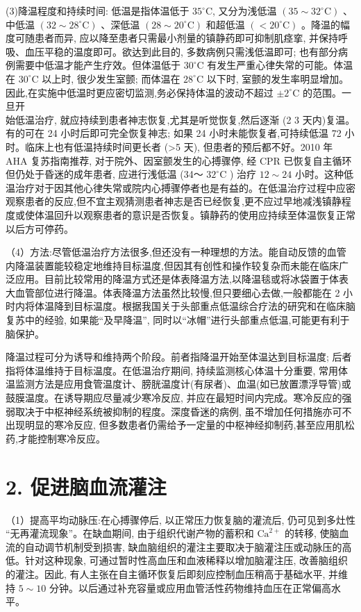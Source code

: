 \documentclass[10pt]{article}
\begin{document}
(3)降温程度和持续时间: 低温是指体温低于 $35^{\circ} \mathrm{C}$, 又分为浅低温 $\left(35 \sim 32^{\circ} \mathrm{C}\right)$ 、中低温 $\left(32 \sim 28^{\circ} \mathrm{C}\right)$ 、深低温 $\left(28 \sim 20^{\circ} \mathrm{C}\right)$ 和超低温 $\left(<20^{\circ} \mathrm{C}\right)$ 。降温的幅度可随患者而异, 应以降至患者只需最小剂量的镇静药即可抑制肌痉挛, 并保持呼吸、血压平稳的温度即可。欲达到此目的, 多数病例只需浅低温即可; 也有部分病例需要中低温才能产生疗效。但体温低于 $30^{\circ} \mathrm{C}$ 有发生严重心律失常的可能。体温在 $30^{\circ} \mathrm{C}$ 以上时, 很少发生室颤; 而体温在 $28^{\circ} \mathrm{C}$ 以下时, 室颤的发生率明显增加。因此,在实施中低温时更应密切监测,务必保持体温的波动不超过 $\pm 2^{\circ} \mathrm{C}$ 的范围。一旦开\\
始低温治疗, 就应持续到患者神志恢复,尤其是听觉恢复,然后逐渐 (2 3 天内)复温。有的可在 24 小时后即可完全恢复神志; 如果 24 小时未能恢复者,可持续低温 72 小时。临床上也有低温持续时间更长者 (>5 天), 但患者的预后都不好。2010 年 AHA 复苏指南推荐, 对于院外、因室颤发生的心搏骤停, 经 CPR 已恢复自主循环但仍处于昏迷的成年患者, 应进行浅低温 (34～ $32^{\circ} \mathrm{C}$ ) 治疗 $12 \sim 24$ 小时。这种低温治疗对于因其他心律失常或院内心搏骤停者也是有益的。在低温治疗过程中应密观察患者的反应,但不宜主观猜测患者神志是否已经恢复,更不应过早地减浅镇静程度或使体温回升以观察患者的意识是否恢复。镇静药的使用应持续至体温恢复正常以后方可停药。

（4）方法:尽管低温治疗方法很多,但还没有一种理想的方法。能自动反馈的血管内降温装置能较稳定地维持目标温度,但因其有创性和操作较复杂而未能在临床广泛应用。目前比较常用的降温方式还是体表降温方法,以降温毯或将冰袋置于体表大血管部位进行降温。体表降温方法虽然比较慢,但只要细心去做,一般都能在 2 小时内将体温降到目标温度。根据我国关于头部重点低温综合疗法的研究和在临床脑复苏中的经验, 如果能“及早降温”, 同时以“冰帽”进行头部重点低温,可能更有利于脑保护。

降温过程可分为诱导和维持两个阶段。前者指降温开始至体温达到目标温度; 后者指将体温维持于目标温度。在低温治疗期间, 持续监测核心体温十分重要, 常用体温监测方法是应用食管温度计、膀胱温度计(有尿者)、血温(如已放置漂浮导管)或鼓膜温度。在诱导期应尽量减少寒冷反应, 并应在最短时间内完成。寒冷反应的强弱取决于中枢神经系统被抑制的程度。深度昏迷的病例, 虽不增加任何措施亦可不出现明显的寒冷反应, 但多数患者仍需给予一定量的中枢神经抑制药,甚至应用肌松药,才能控制寒冷反应。

\section*{2. 促进脑血流灌注}
（1）提高平均动脉压:在心搏骤停后, 以正常压力恢复脑的灌流后, 仍可见到多灶性 “无再灌流现象”。在缺血期间, 由于组织代谢产物的蓄积和 $\mathrm{Ca}^{2+}$ 的转移, 使脑血流的自动调节机制受到损害, 缺血脑组织的灌注主要取决于脑灌注压或动脉压的高低。针对这种现象, 可通过暂时性高血压和血液稀释以增加脑灌注压, 改善脑组织的灌注。因此, 有人主张在自主循环恢复后即刻应控制血压稍高于基础水平, 并维持 $5 \sim 10$ 分钟。以后通过补充容量或应用血管活性药物维持血压在正常偏高水平。
\end{document}

